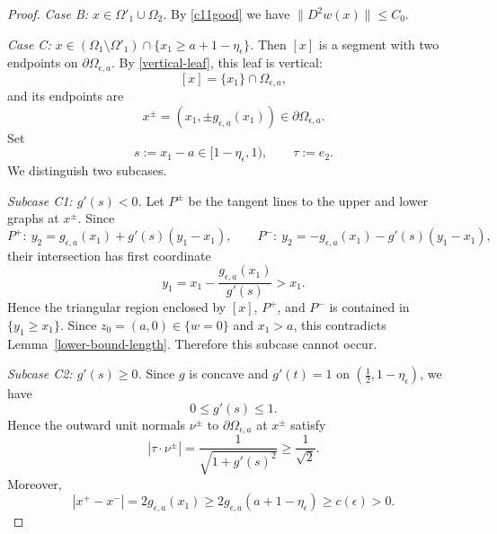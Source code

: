\documentclass[reqno,11pt]{amsart}
\numberwithin{equation}{section}
\theoremstyle{remark}
\begin{document}
\begin{proof}
\smallskip
\noindent\emph{Case B: $x\in \Omega'_{1}\cup\Omega_{2}$.}
By \eqref{c11good} we have $\|D^2w(x)\|\le C_0$.

\smallskip
\noindent\emph{Case C: $x\in (\Omega_{1}\setminus\Omega'_{1})\cap\{x_1\ge a+1-\eta_\epsilon\}$.}
Then $[x]$ is a segment with two endpoints on $\partial\Omega_{\epsilon,a}$.
By \eqref{vertical-leaf}, this leaf is vertical:
\[
[x]=\{x_1\}\cap\Omega_{\epsilon,a},
\]
and its endpoints are
\[
x^\pm=(x_1,\pm g_{\epsilon,a}(x_1))\in\partial\Omega_{\epsilon,a}.
\]
Set
\[
s:=x_1-a\in[1-\eta_\epsilon,1),
\qquad
\tau:=e_2.
\]
We distinguish two subcases.

\smallskip
\noindent\emph{Subcase C1: $g'(s)<0$.}
Let $P^\pm$ be the tangent lines to the upper and lower graphs at $x^\pm$.
Since
\[
P^+:\ y_2=g_{\epsilon,a}(x_1)+g'(s)(y_1-x_1),
\qquad
P^-:\ y_2=-g_{\epsilon,a}(x_1)-g'(s)(y_1-x_1),
\]
their intersection has first coordinate
\[
y_1=x_1-\frac{g_{\epsilon,a}(x_1)}{g'(s)}>x_1.
\]
Hence the triangular region enclosed by $[x]$, $P^+$, and $P^-$ is contained in
$\{y_1\ge x_1\}$.
Since $z_0=(a,0)\in\{w=0\}$ and $x_1>a$, this contradicts
Lemma~\ref{lower-bound-length}. Therefore this subcase cannot occur.

\smallskip
\noindent\emph{Subcase C2: $g'(s)\ge0$.}
Since $g$ is concave and $g'(t)=1$ on $(\frac12,1-\eta_\epsilon)$, we have
\[
0\le g'(s)\le 1.
\]
Hence the outward unit normals $\nu^\pm$ to $\partial\Omega_{\epsilon,a}$ at $x^\pm$ satisfy
\[
|\tau\cdot \nu^\pm|
=\frac{1}{\sqrt{1+g'(s)^2}}
\ge \frac{1}{\sqrt2}.
\]
Moreover,
\[
|x^+-x^-|=2g_{\epsilon,a}(x_1)
\ge 2g_{\epsilon,a}(a+1-\eta_\epsilon)
\ge c(\epsilon)>0.
\]


\end{proof}
\end{document}
